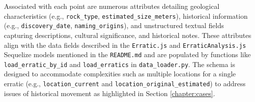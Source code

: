 \documentclass[
11pt, %
english, %
singlespacing, %
headsepline, %
]{MastersDoctoralThesis} %
\begin{document}
Associated with each point are numerous attributes detailing geological characteristics (e.g., \texttt{rock\_type}, \texttt{estimated\_size\_meters}), historical information (e.g., \texttt{discovery\_date}, \texttt{naming\_origins}), and unstructured textual fields capturing descriptions, cultural significance, and historical notes. These attributes align with the data fields described in the \texttt{Erratic.js} and \texttt{ErraticAnalysis.js} Sequelize models mentioned in the \texttt{README.md} and are populated by functions like \texttt{load\_erratic\_by\_id} and \texttt{load\_erratics} in \texttt{data\_loader.py}. The schema is designed to accommodate complexities such as multiple locations for a single erratic (e.g., \texttt{location\_current} and \texttt{location\_original\_estimated}) to address issues of historical movement as highlighted in Section \ref{chapter:cases}.
\end{document}
